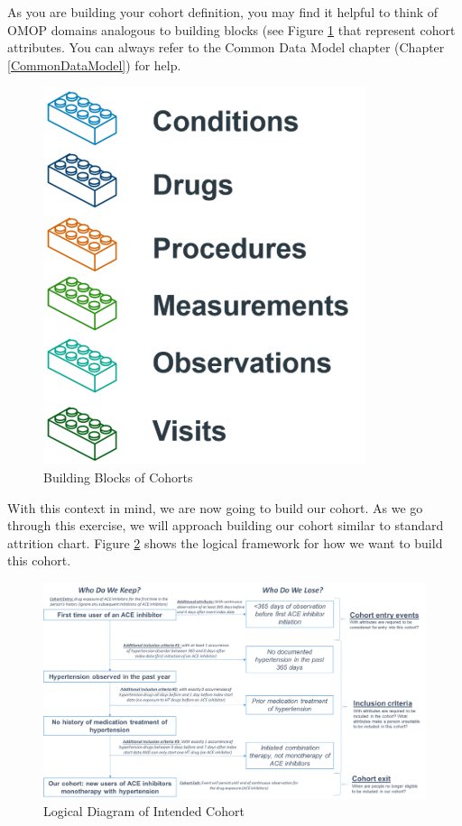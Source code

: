 \documentclass[11pt]{book}
\theoremstyle{definition}
\theoremstyle{definition}
\theoremstyle{definition}
\theoremstyle{remark}
\begin{document}
As you are building your cohort definition, you may find it helpful to think of OMOP domains analogous to building blocks (see Figure \ref{fig:cohortLegos} that represent cohort attributes. You can always refer to the Common Data Model chapter (Chapter \ref{CommonDataModel}) for help.

\begin{figure}

{\centering \includegraphics[width=0.5\linewidth]{images/Cohorts/cohort-legos} 

}

\caption{Building Blocks of Cohorts}\label{fig:cohortLegos}
\end{figure}

With this context in mind, we are now going to build our cohort. As we go through this exercise, we will approach building our cohort similar to standard attrition chart. Figure \ref{fig:CohortPractice} shows the logical framework for how we want to build this cohort.

\begin{figure}

{\centering \includegraphics[width=0.9\linewidth]{images/Cohorts/CohortPractice} 

}

\caption{Logical Diagram of Intended Cohort}\label{fig:CohortPractice}
\end{figure}
\end{document}
